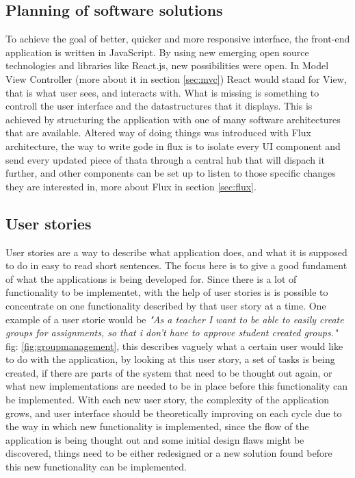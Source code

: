 \subsection{Planning of software solutions}
To achieve the goal of better, quicker and more responsive interface, the front-end application is written in JavaScript. By using new emerging open source technologies and libraries like React.js, new possibilities were open. In Model View Controller (more about it in section \ref{sec:mvc}) React would stand for View, that is what user sees, and interacts with. What is missing is something to controll the user interface and the datastructures that it displays. This is achieved by structuring the application with one of many software architectures that are available. Altered way of doing things was introduced with Flux architecture, the way to write gode in flux is to isolate every UI component and send every updated piece of thata through a central hub that will dispach it further, and other components can be set up to listen to those specific changes they are interested in, more about Flux in section \ref{sec:flux}.
\todo{}
\subsection{User stories}
User stories are a way to describe what application does, and what it is supposed to do in easy to read short sentences. The focus here is to give a good fundament of what the applications is being developed for. Since there is a lot of functionality to be implementet, with the help of user stories is is possible to concentrate on one functionality described by that user story at a time. One example of a user storie would be \emph{"As a teacher I want to be able to easily create groups for assignments, so that i don't have to approve student created groups."} fig: \ref{fig:groupmanagement},  this describes vaguely what a certain user would like to do with the application, by looking at this user story, a set of tasks is being created, if there are parts of the system that need to be thought out again, or what new implementations are needed to be in place before this functionality can be implemented. With each new user story, the complexity of the application grows, and user interface should be theoretically improving on each cycle due to the way in which new functionality is implemented, since the flow of the application is being thought out and some initial design flaws might be discovered, things need to be either redesigned or a new solution found before this new functionality can be implemented. 


